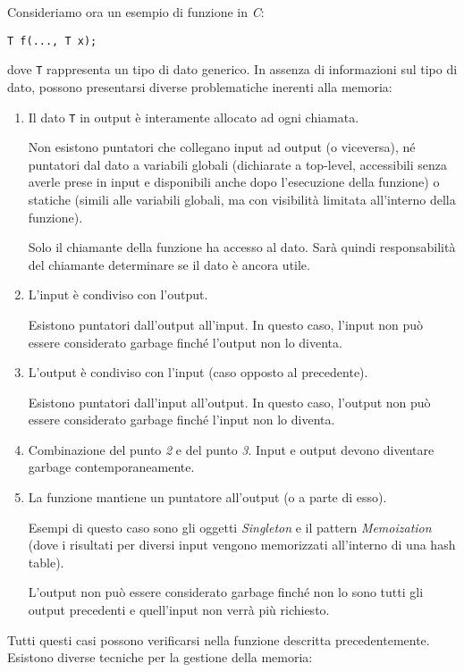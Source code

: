 \documentclass{article}
\begin{document}
Consideriamo ora un esempio di funzione in \textit{C}:
\begin{center}
    \texttt{T f(..., T x);}
\end{center}
dove \texttt{T} rappresenta un tipo di dato generico. In assenza di informazioni sul tipo di dato, possono presentarsi diverse problematiche inerenti alla memoria:
\begin{enumerate}
    \item Il dato \texttt{T} in output è interamente allocato ad ogni chiamata. 
    
    Non esistono puntatori che collegano input ad output (o viceversa), né puntatori dal dato a variabili globali (dichiarate a top-level, accessibili senza averle prese in input e disponibili anche dopo l'esecuzione della funzione) o statiche (simili alle variabili globali, ma con visibilità limitata all'interno della funzione).
    
    Solo il chiamante della funzione ha accesso al dato. Sarà quindi responsabilità del chiamante determinare se il dato è ancora utile.
    \item L'input è condiviso con l'output.
    
    Esistono puntatori dall'output all'input. In questo caso, l'input non può essere considerato garbage finché l'output non lo diventa.
    \item L'output è condiviso con l'input (caso opposto al precedente).
    
    Esistono puntatori dall'input all'output. In questo caso, l'output non può essere considerato garbage finché l'input non lo diventa.
    \item Combinazione del punto \textit{2} e del punto \textit{3}. Input e output devono diventare garbage contemporaneamente.
    \item La funzione mantiene un puntatore all'output (o a parte di esso). 
    
    Esempi di questo caso sono gli oggetti \textit{Singleton} e il pattern \textit{Memoization} (dove i risultati per diversi input vengono memorizzati all'interno di una hash table).

    L'output non può essere considerato garbage finché non lo sono tutti gli output precedenti e quell'input non verrà più richiesto.
\end{enumerate}
Tutti questi casi possono verificarsi nella funzione descritta precedentemente.\vspace{14pt}\\
Esistono diverse tecniche per la gestione della memoria:
\end{document}
